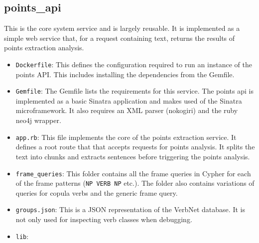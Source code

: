 \subsection*{points\_api}
  This is the core system service and is largely reusable. It is implemented as a simple web service that, for a request containing text, returns the results of points extraction analysis.
  \begin{itemize}
    \item
      \texttt{Dockerfile}: This defines the configuration required to run an instance of the points API. This includes installing the dependencies from the Gemfile.
    \item
      \texttt{Gemfile}: The Gemfile lists the requirements for this service. The points api is implemented as a basic Sinatra application and makes used of the Sinatra microframework. It also requires an XML parser (nokogiri) and the ruby neo4j wrapper.
    \item
      \texttt{app.rb}: This file implements the core of the points extraction service. It defines a root route that that accepts requests for points analysis. It splits the text into chunks and extracts sentences before triggering the points analysis.
    \item
      \texttt{frame\_queries}: This folder contains all the frame queries in Cypher for each of the frame patterns (\texttt{NP VERB NP} etc.). The folder also contains variations of queries for copula verbs and the generic frame query.
    \item
      \texttt{groups.json}: This is a JSON representation of the VerbNet database. It is not only used for inspecting verb classes when debugging.
    \item
      \texttt{lib}:


\end{itemize}
